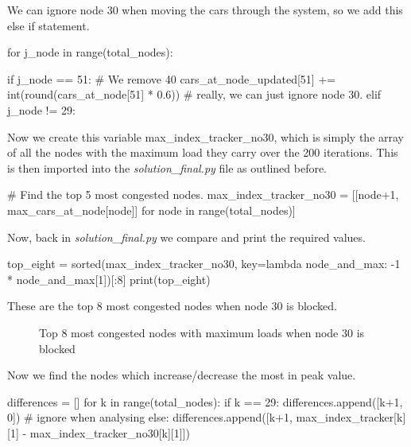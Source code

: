 \documentclass[paper=a4, fontsize=12pt]{scrartcl} %
\numberwithin{equation}{section}       %
\numberwithin{figure}{section}         %
\numberwithin{table}{section}          %
\begin{document}
\begin{enumerate}
We can ignore node 30 when moving the cars through the system, so we add this else if statement.

\begin{python}
 for j_node in range(total_nodes):

        if j_node == 51:
            # We remove 40%
            cars_at_node_updated[51] += int(round(cars_at_node[51] * 0.6))
            # really, we can just ignore node 30.
        elif j_node != 29:
\end{python}

Now we create this variable max\_index\_tracker\_no30, which is simply the array of all the nodes with the maximum load they carry over the 200 iterations. This is then imported into the \textit{solution\_final.py} file as outlined before.

\begin{python}
# Find the top 5 most congested nodes.
max_index_tracker_no30 = [[node+1, max_cars_at_node[node]]
                          for node in range(total_nodes)]
\end{python}

Now, back in \textit{solution\_final.py} we compare and print the required values.

\begin{python}
top_eight = sorted(max_index_tracker_no30, 
                       key=lambda node_and_max: -1 * node_and_max[1])[:8]
print(top_eight)
\end{python}

These are the top 8 most congested nodes when node 30 is blocked.

\begin{figure}[h]
\caption{Top 8 most congested nodes with maximum loads when node 30 is blocked}
\centering

\end{figure}

\leavevmode
\newline



Now we find the nodes which increase/decrease the most in peak value.

\begin{python}
    differences = []
    for k in range(total_nodes):
        if k == 29:
            differences.append([k+1, 0])  # ignore when analysing
        else:
            differences.append([k+1, max_index_tracker[k][1] 
                                - max_index_tracker_no30[k][1]])


\end{python}
\end{enumerate}
\end{document}
